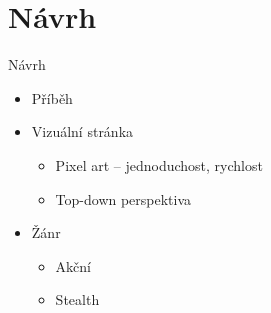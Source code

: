 \documentclass[10pt]{beamer}
\begin{document}
	\begin{frame}[plain]
	\end{frame}
	
	\section{Návrh}
	\begin{frame}{Návrh}
		\begin{itemize}\setlength\itemsep{10pt}
			\item Příběh
			\item Vizuální stránka
			\begin{itemize}
				\item Pixel art – jednoduchost, rychlost
				\item Top-down perspektiva
			\end{itemize}
			\item Žánr
			\begin{itemize}
				\item Akční
				\item Stealth
			\end{itemize}
		\end{itemize}		
	\end{frame}
		
\end{document}
